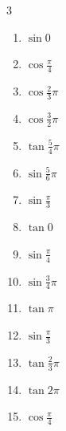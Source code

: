\begin{multicols}{3}
\begin{enumerate}
  \item $\displaystyle \sin{0}$
        \phantom{$\displaystyle =0$}

  \item $\displaystyle \cos{\frac{\pi}{4}}$

\columnbreak %

\resetques

  \item $\displaystyle \cos{\frac{2}{3}\pi}$

  \item $\displaystyle \cos{\frac{3}{2}\pi}$
        \phantom{$\displaystyle =0$}

  \item $\displaystyle \tan{\frac{5}{4}\pi}$
        \phantom{$\displaystyle =1$}

  \item $\displaystyle \sin{\frac{5}{6}\pi}$

  \item $\displaystyle \sin{\frac{\pi}{3}}$

  \item $\displaystyle \tan{0}$
        \phantom{$\displaystyle =0$}

  \item $\displaystyle \sin{\frac{\pi}{4}}$

  \item $\displaystyle \sin{\frac{3}{4}\pi}$

  \item $\displaystyle \tan{\pi}$
        \phantom{$\displaystyle =0$}

  \item $\displaystyle \sin{\frac{\pi}{3}}$

  \item $\displaystyle \tan{\frac{2}{3}\pi}$

  \item $\displaystyle \tan{2\pi}$
        \phantom{$\displaystyle =0$}

  \item $\displaystyle \cos{\frac{\pi}{4}}$


\end{enumerate}
\end{multicols}
